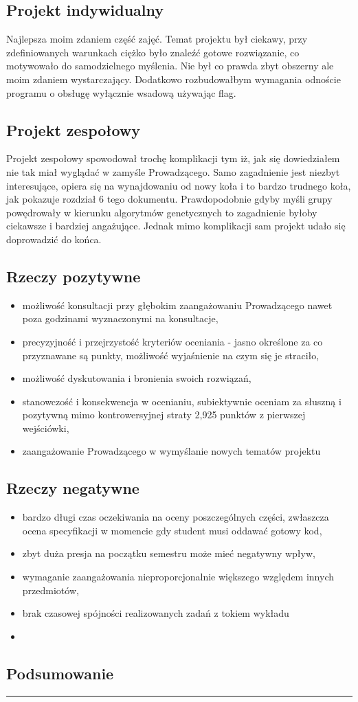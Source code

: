 \documentclass[a4paper,11pt]{article}
\newcommand{\linia}{\rule{\linewidth}{0.4mm}}
\begin{document}
\subsection{Projekt indywidualny}
Najlepsza moim zdaniem część zajęć. Temat projektu był ciekawy, przy zdefiniowanych warunkach ciężko było znaleźć gotowe rozwiązanie, co motywowało do samodzielnego myślenia. Nie był co prawda zbyt obszerny ale moim zdaniem wystarczający. Dodatkowo rozbudowałbym wymagania odnoście programu o obsługę wyłącznie wsadową używając flag.
\subsection{Projekt zespołowy}
Projekt zespołowy spowodował trochę komplikacji tym iż, jak się dowiedziałem nie tak miał wyglądać w zamyśle Prowadzącego. Samo zagadnienie jest niezbyt interesujące, opiera się na wynajdowaniu od nowy koła i to bardzo trudnego koła, jak pokazuje rozdział 6 tego dokumentu. Prawdopodobnie gdyby myśli grupy powędrowały w kierunku algorytmów genetycznych to zagadnienie byłoby ciekawsze i bardziej angażujące. Jednak mimo komplikacji sam projekt udało się doprowadzić do końca.

\subsection{Rzeczy pozytywne}
\begin{itemize}
\item możliwość konsultacji przy głębokim zaangażowaniu Prowadzącego nawet poza godzinami wyznaczonymi na konsultacje,
\item precyzyjność i przejrzystość kryteriów oceniania - jasno określone za co przyznawane są punkty, możliwość wyjaśnienie na czym się je straciło,
\item możliwość dyskutowania i bronienia swoich rozwiązań,
\item stanowczość i konsekwencja w ocenianiu, subiektywnie oceniam za słuszną i pozytywną mimo kontrowersyjnej straty 2,925 punktów z pierwszej wejściówki,
\item zaangażowanie Prowadzącego w wymyślanie nowych tematów projektu
\end{itemize}
\subsection{Rzeczy negatywne}
\begin{itemize}
\item bardzo długi czas oczekiwania na oceny poszczególnych części, zwłaszcza ocena specyfikacji w momencie gdy student musi oddawać gotowy kod,
\item zbyt duża presja na początku semestru może mieć negatywny wpływ,
\item wymaganie zaangażowania nieproporcjonalnie większego względem innych przedmiotów,
\item brak czasowej spójności realizowanych zadań z tokiem wykładu
\item 
\end{itemize}
\subsection{Podsumowanie}
\noindent\linia
\end{document}
